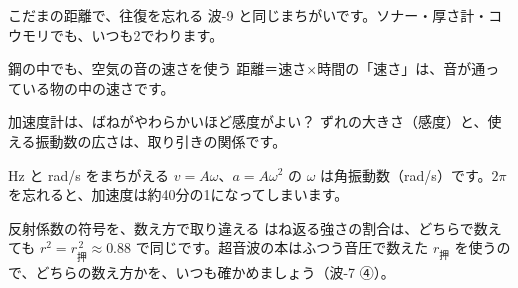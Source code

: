\begin{tsumazuki}{こだまの距離で、往復を忘れる}
波-9 と同じまちがいです。ソナー・厚さ計・コウモリでも、いつも2でわります。
\end{tsumazuki}

\begin{tsumazuki}{鋼の中でも、空気の音の速さを使う}
距離＝速さ×時間の「速さ」は、音が通っている物の中の速さです。
\end{tsumazuki}

\begin{tsumazuki}{加速度計は、ばねがやわらかいほど感度がよい？}
ずれの大きさ（感度）と、使える振動数の広さは、取り引きの関係です。
\end{tsumazuki}

\begin{tsumazuki}{Hz と rad/s をまちがえる}
$v=A\omega$、$a=A\omega^2$ の $\omega$ は角振動数（rad/s）です。$2\pi$ を忘れると、加速度は約40分の1になってしまいます。
\end{tsumazuki}

\begin{tsumazuki}{反射係数の符号を、数え方で取り違える}
はね返る強さの割合は、どちらで数えても $r^2=r_{\text{押}}^{\,2}\approx0.88$ で同じです。超音波の本はふつう音圧で数えた $r_{\text{押}}$ を使うので、どちらの数え方かを、いつも確かめましょう（波-7 ④）。
\end{tsumazuki}

